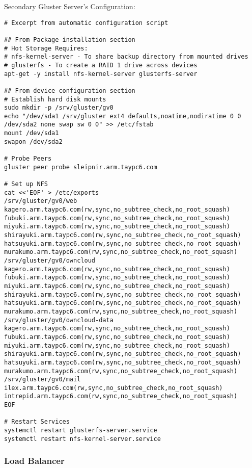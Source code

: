 \documentclass[12pt]{spieman}  %
\begin{document}
Secondary Gluster Server's Configuration:
\begin{lstlisting}
# Excerpt from automatic configuration script

## From Package installation section
# Hot Storage Requires:
# nfs-kernel-server - To share backup directory from mounted drives
# glusterfs - To create a RAID 1 drive across devices
apt-get -y install nfs-kernel-server glusterfs-server

## From device configuration section
# Establish hard disk mounts
sudo mkdir -p /srv/gluster/gv0
echo "/dev/sda1 /srv/gluster ext4 defaults,noatime,nodiratime 0 0
/dev/sda2 none swap sw 0 0" >> /etc/fstab
mount /dev/sda1
swapon /dev/sda2

# Probe Peers
gluster peer probe sleipnir.arm.taypc6.com

# Set up NFS
cat <<'EOF' > /etc/exports
/srv/gluster/gv0/web kagero.arm.taypc6.com(rw,sync,no_subtree_check,no_root_squash) fubuki.arm.taypc6.com(rw,sync,no_subtree_check,no_root_squash) miyuki.arm.taypc6.com(rw,sync,no_subtree_check,no_root_squash) shirayuki.arm.taypc6.com(rw,sync,no_subtree_check,no_root_squash) hatsuyuki.arm.taypc6.com(rw,sync,no_subtree_check,no_root_squash) murakumo.arm.taypc6.com(rw,sync,no_subtree_check,no_root_squash)
/srv/gluster/gv0/owncloud kagero.arm.taypc6.com(rw,sync,no_subtree_check,no_root_squash) fubuki.arm.taypc6.com(rw,sync,no_subtree_check,no_root_squash) miyuki.arm.taypc6.com(rw,sync,no_subtree_check,no_root_squash) shirayuki.arm.taypc6.com(rw,sync,no_subtree_check,no_root_squash) hatsuyuki.arm.taypc6.com(rw,sync,no_subtree_check,no_root_squash) murakumo.arm.taypc6.com(rw,sync,no_subtree_check,no_root_squash)
/srv/gluster/gv0/owncloud-data kagero.arm.taypc6.com(rw,sync,no_subtree_check,no_root_squash) fubuki.arm.taypc6.com(rw,sync,no_subtree_check,no_root_squash) miyuki.arm.taypc6.com(rw,sync,no_subtree_check,no_root_squash) shirayuki.arm.taypc6.com(rw,sync,no_subtree_check,no_root_squash) hatsuyuki.arm.taypc6.com(rw,sync,no_subtree_check,no_root_squash) murakumo.arm.taypc6.com(rw,sync,no_subtree_check,no_root_squash)
/srv/gluster/gv0/mail ilex.arm.taypc6.com(rw,sync,no_subtree_check,no_root_squash) intrepid.arm.taypc6.com(rw,sync,no_subtree_check,no_root_squash)
EOF

# Restart Services
systemctl restart glusterfs-server.service
systemctl restart nfs-kernel-server.service
\end{lstlisting}

\subsubsection{Load Balancer}
\label{subsubsec:lb-config}
\end{document}

